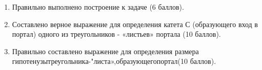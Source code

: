 
\markSection

\begin{enumerate}
    \item Правильно выполнено построение к задаче (6 баллов). 
    \item Составлено верное выражение для определения катета С (образующего вход в портал) одного из треугольников - «листьев» портала (10 баллов). 
    \item Правильно составлено выражение для определения размера гипотенузытреугольника-"листа»,образующегопортал(10 баллов).
\end{enumerate}